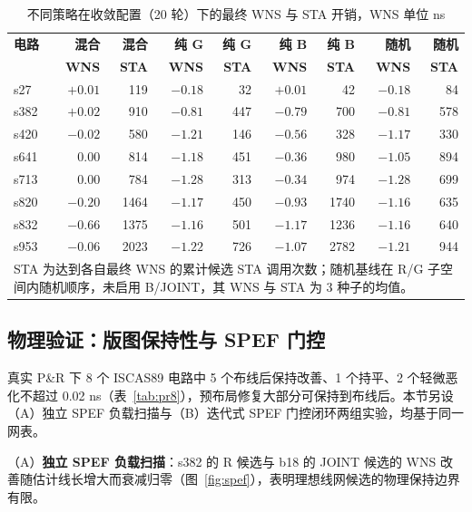 \begin{table}[!t]
\centering
\caption{不同策略在收敛配置（20 轮）下的最终 WNS 与 STA 开销，WNS 单位 ns}
\label{tab:min_trials}
\setlength{\tabcolsep}{2pt}
\footnotesize
\begin{tabular}{lrrrrrrrr}
\toprule
\textbf{电路} & \textbf{混合} & \textbf{混合} & \textbf{纯 G} & \textbf{纯 G} & \textbf{纯 B} & \textbf{纯 B} & \textbf{随机} & \textbf{随机} \\
 & \textbf{WNS} & \textbf{STA} & \textbf{WNS} & \textbf{STA} & \textbf{WNS} & \textbf{STA} & \textbf{WNS} & \textbf{STA} \\
\midrule
s27  & $+0.01$ & 119  & $-0.18$ & 32  & $+0.01$ & 42  & $-0.18$ & 84 \\
s382 & $+0.02$ & 910  & $-0.81$ & 447 & $-0.79$ & 700 & $-0.81$ & 578 \\
s420 & $-0.02$ & 580  & $-1.21$ & 146 & $-0.56$ & 328 & $-1.17$ & 330 \\
s641 & $0.00$  & 814  & $-1.18$ & 451 & $-0.36$ & 980 & $-1.05$ & 894 \\
s713 & $0.00$  & 784  & $-1.28$ & 313 & $-0.34$ & 974 & $-1.28$ & 699 \\
s820 & $-0.20$ & 1464 & $-1.17$ & 450 & $-0.93$ & 1740 & $-1.16$ & 635 \\
s832 & $-0.66$ & 1375 & $-1.16$ & 501 & $-1.17$ & 1236 & $-1.16$ & 640 \\
s953 & $-0.06$ & 2023 & $-1.22$ & 726 & $-1.07$ & 2782 & $-1.21$ & 944 \\
\bottomrule
\multicolumn{9}{p{0.95\columnwidth}}{\footnotesize STA 为达到各自最终 WNS 的累计候选 STA 调用次数；随机基线在 R/G 子空间内随机顺序，未启用 B/JOINT，其 WNS 与 STA 为 3 种子的均值。}\\
\end{tabular}
\end{table}

\subsection{物理验证：版图保持性与 SPEF 门控}\label{sec:phys_closure}

真实 P\&R 下 8 个 ISCAS89 电路中 5 个布线后保持改善、1 个持平、2 个轻微恶化不超过 0.02 ns（表~\ref{tab:pr8}），预布局修复大部分可保持到布线后。本节另设（A）独立 SPEF 负载扫描与（B）迭代式 SPEF 门控闭环两组实验，均基于同一网表。

（A）\textbf{独立 SPEF 负载扫描}：s382 的 R 候选与 b18 的 JOINT 候选的 WNS 改善随估计线长增大而衰减归零（图~\ref{fig:spef}），表明理想线网候选的物理保持边界有限。

